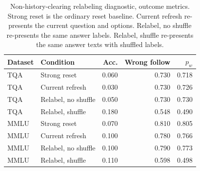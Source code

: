 \begin{table}[t]
\centering
\footnotesize
\setlength{\tabcolsep}{2pt}
\renewcommand{\arraystretch}{1.05}
\begin{tabular}{llrrr}
\hline
Dataset & Condition & Acc. & Wrong follow & $p_w$ \\
\hline
TQA & Strong reset & 0.060 & 0.730 & 0.718 \\
TQA & Current refresh & 0.030 & 0.730 & 0.726 \\
TQA & Relabel, no shuffle & 0.050 & 0.730 & 0.730 \\
TQA & Relabel, shuffle & 0.180 & 0.548 & 0.490 \\
\hline
MMLU & Strong reset & 0.070 & 0.810 & 0.805 \\
MMLU & Current refresh & 0.100 & 0.780 & 0.766 \\
MMLU & Relabel, no shuffle & 0.100 & 0.790 & 0.773 \\
MMLU & Relabel, shuffle & 0.110 & 0.598 & 0.498 \\
\hline
\end{tabular}
\caption{Non-history-clearing relabeling diagnostic, outcome metrics. Strong reset is the ordinary reset baseline. Current refresh re-presents the current question and options. Relabel, no shuffle re-presents the same answer labels. Relabel, shuffle re-presents the same answer texts with shuffled labels.}
\label{tab:non-history-clearing-recovery-b}
\end{table}